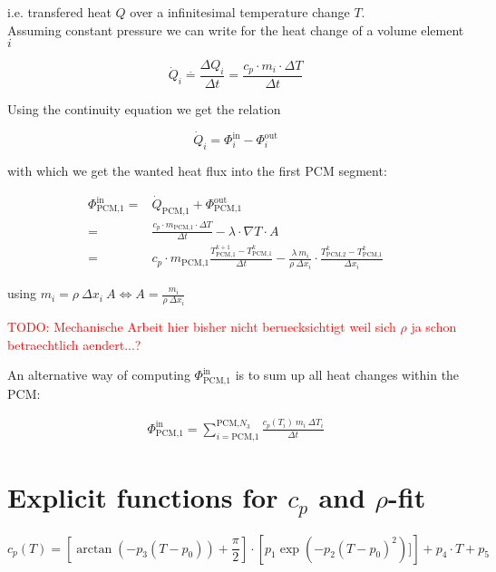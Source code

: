 \documentclass{scrartcl}[12pt, halfparskip]
\newcommand{\todo}[1]{\textcolor{red}{TODO: #1}}
\begin{document}
i.e. transfered heat $Q$ over a infinitesimal temperature change $T$. \\

Assuming constant pressure we can write for the heat change of a volume element $i$

\begin{equation*}
	\dot{Q}_i \stackrel{\cdot}{=} \frac{\Delta Q_i}{\Delta t} = \frac{c_p \cdot m_i \cdot \Delta T}{\Delta t}
\end{equation*}

Using the continuity equation we get the relation

\begin{equation*}
	\dot{Q}_i = \Phi_i^{\text{in}} - \Phi_i^{\text{out}}
\end{equation*}

with which we get the wanted heat flux into the first PCM segment:

\begin{align*}
	\Phi_{\text{PCM,1}}^{\text{in}} = & \dot{Q}_{\text{PCM,1}} + \Phi_{\text{PCM,1}}^{\text{out}} \\
	= & \frac{c_p \cdot m_{\text{PCM,}1} \cdot \Delta T}{\Delta t} - \lambda \cdot \nabla T \cdot A \\
	= & c_p \cdot m_{\text{PCM,}1} \frac{T_{\text{PCM,}1}^{k+1} - T_{\text{PCM,}1}^k}{\Delta t} - \frac{\lambda \ m_i}{\rho \ \Delta x_i} \cdot \frac{T_{\text{PCM,}2}^{k} - T_{\text{PCM,}1}^k}{\Delta x_i}
\end{align*}

using $m_i = \rho \ \Delta x_i \ A \Leftrightarrow A = \frac{m_i}{\rho \ \Delta x_i}$

\todo{Mechanische Arbeit hier bisher nicht beruecksichtigt weil sich $\rho$ ja schon betraechtlich aendert...?}

An alternative way of computing $\Phi_{\text{PCM,}1}^{\text{in}}$ is to sum up all heat changes within the PCM:

\begin{align*}
	\Phi_{\text{PCM,1}}^{\text{in}} = \sum\limits_{i=\text{PCM,1}}^{\text{PCM,}N_3} \frac{c_p(T_i) \ m_i \ \Delta T_i}{\Delta t}
\end{align*}


\section{Explicit functions for $c_p$ and $\rho$-fit}

\begin{equation*}
	c_p(T) = \left[ \arctan (-p_3 (T-p_0)) + \frac{\pi}{2} \right] \cdot \left[ p_1 \exp(-p_2(T-p_0)^2)] \right] + p_4 \cdot T + p_5 
\end{equation*}
\end{document}

